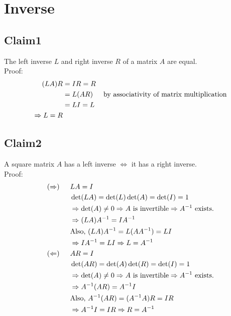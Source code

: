 \documentclass[12pt]{article}
\begin{document}
\section{Inverse}
\subsection{Claim1}
The left inverse $L$ and right inverse $R$ of a matrix $A$ are equal. \\
\indent Proof: \\
\begin{align*}
(LA)R &= IR = R \\
&= L(AR) \indent \text{by associativity of matrix multiplication} \\
&= LI = L \\
\Rightarrow L = R
\end{align*}

\subsection{Claim2}
A square matrix $A$ has a left inverse $\Leftrightarrow$ it has a right inverse. \\
\indent Proof: \\
\begin{align*}
(\Rightarrow) \indent & LA = I \\
&\det(LA) = \det(L)\det(A) = \det(I) = 1 \\
& \Rightarrow \det(A) \ne 0 \Rightarrow A \text{ is invertible} \Rightarrow A^{-1} \text{ exists}. \\
& \Rightarrow (LA)A^{-1} = IA^{-1} \\
& \text{Also, } (LA)A^{-1} = L(AA^{-1}) = LI \\
& \Rightarrow IA^{-1} = LI \Rightarrow L = A^{-1} \\
(\Leftarrow) \indent & AR = I \\
& \det(AR) = \det(A)\det(R) = \det(I) = 1 \\
& \Rightarrow \det(A) \ne 0 \Rightarrow A \text{ is invertible} \Rightarrow A^{-1} \text{ exists}. \\
& \Rightarrow A^{-1}(AR) = A^{-1}I \\
& \text{Also, } A^{-1}(AR) = (A^{-1}A)R = IR \\
& \Rightarrow A^{-1}I = IR \Rightarrow R = A^{-1}\\
\end{align*}
\end{document}
